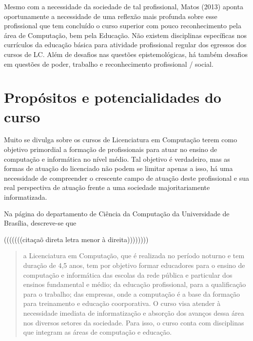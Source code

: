 Mesmo com a necessidade da sociedade de tal profissional, Matos (2013) aponta oportunamente a necessidade de uma reflexão mais profunda sobre esse profissional que tem concluído o curso superior com pouco reconhecimento pela área de Computação, bem pela Educação. Não existem disciplinas específicas nos currículos da educação básica para atividade profissional regular dos egressos dos cursos de LC. Além de desafios nas questões epistemológicas, há também desafios em questões de poder, trabalho e reconhecimento profissional / social.	
 

\section{Propósitos e potencialidades do curso}%
 
Muito se divulga sobre os cursos de Licenciatura em Computação terem como objetivo primordial a formação de profissionais para atuar no ensino de computação e informática no nível médio. Tal objetivo é verdadeiro, mas as formas de atuação do licenciado não podem se limitar apenas a isso, há uma necessidade de compreender o crescente campo de atuação deste profissional e sua real perspectiva de atuação frente a uma sociedade majoritariamente informatizada.	

	Na página do departamento de Ciência da Computação da Universidade de Brasília, descreve-se que 
    
(((((((citaçaõ direta letra menor à direita))))))))
\begin{quotation}
a Licenciatura em Computação, que é realizada no período noturno e tem duração de 4,5 anos, tem por objetivo formar educadores para o ensino de computação e informática das escolas da rede pública e particular dos ensinos fundamental e médio; da educação profissional, para a qualificação para o trabalho; das empresas, onde a computação é a base da formação para treinamento e educação coorporativa. O curso visa atender à necessidade imediata de informatização e absorção dos avanços dessa área nos diversos setores da sociedade. Para isso, o curso conta com disciplinas que integram as áreas de computação e educação.
\end{quotation}
 
